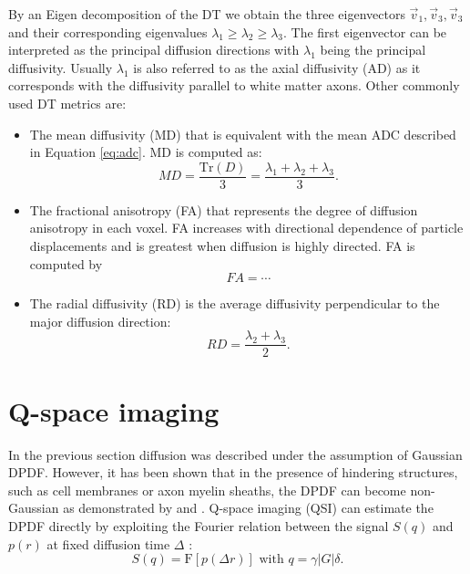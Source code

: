 By an Eigen decomposition of the DT we obtain the three eigenvectors $\vec{v}_1, \vec{v}_3, \vec{v}_3$ and their corresponding eigenvalues $\lambda_1\ge\lambda_2\ge\lambda_3$. The first eigenvector can be interpreted as the principal diffusion directions with $\lambda_1$ being the principal diffusivity. Usually $\lambda_1$ is also referred to as the axial diffusivity (AD) as it corresponds with the diffusivity parallel to white matter axons. Other commonly used DT metrics are:
\begin{itemize}
	\item The mean diffusivity (MD) that is equivalent with the mean ADC described in Equation \ref{eq:adc}. MD is computed as:
	\begin{equation}
		MD = \frac{\mbox{Tr}(D)}{3} = \frac{\lambda_1 + \lambda_2 +\lambda_3}{3}.
	\end{equation}
	\item The fractional anisotropy (FA) that represents the degree of diffusion anisotropy in each voxel. FA increases
	with directional dependence of particle displacements and is greatest when diffusion is highly directed. FA is computed by
	\begin{equation}
		FA = \cdots
	\end{equation}
	\item The radial diffusivity (RD) is the average diffusivity perpendicular to the major diffusion direction:
	\begin{equation}
		RD = \frac{\lambda_2 + \lambda_3}{2}.
	\end{equation}
\end{itemize}


\section{Q-space imaging}
\label{sec:qspace}
In the previous section diffusion was described under the assumption of Gaussian DPDF. However, it has been shown that in the presence of hindering structures, such as cell membranes or axon myelin sheaths, the DPDF can become non-Gaussian as demonstrated by \citet{Callaghan:1996} and \citet{Liu:2005}. Q-space imaging (QSI) can estimate the DPDF directly by exploiting the Fourier relation between the signal $S(q)$ and $p(r)$ at fixed diffusion time $\Delta$ \citep{Callaghan:1994}:
\begin{equation}
	\label{eq:qspaceft}
	S(q)=\mbox{F}\left[p(\Delta r)\right] \mbox{ with } q = \gamma|G|\delta. 
\end{equation}
